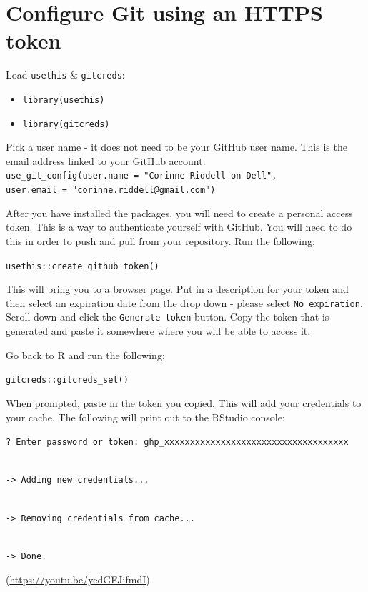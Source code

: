 \documentclass[
]{book}
\providecommand{\tightlist}{%
  \setlength{\itemsep}{0pt}\setlength{\parskip}{0pt}}
\begin{document}
\hypertarget{configure-git-using-an-https-token}{%
\section{Configure Git using an HTTPS token}\label{configure-git-using-an-https-token}}

Load \texttt{usethis} \& \texttt{gitcreds}:

\begin{itemize}
\tightlist
\item
  \texttt{library(usethis)}
\item
  \texttt{library(gitcreds)}
\end{itemize}

Pick a user name - it does not need to be your GitHub user name. This is the email address linked to your GitHub account:\\
\texttt{use\_git\_config(user.name\ =\ "Corinne\ Riddell\ on\ Dell",}
\texttt{user.email\ =\ "corinne.riddell@gmail.com")}

After you have installed the packages, you will need to create a personal access token. This is a way to authenticate yourself with GitHub. You will need to do this in order to push and pull from your repository. Run the following:

\texttt{usethis::create\_github\_token()}

This will bring you to a browser page. Put in a description for your token and then select an expiration date from the drop down - please select \texttt{No\ expiration}. Scroll down and click the \texttt{Generate\ token} button. Copy the token that is generated and paste it somewhere where you will be able to access it.

Go back to R and run the following:

\texttt{gitcreds::gitcreds\_set()}

When prompted, paste in the token you copied. This will add your credentials to your cache. The following will print out to the RStudio console:

\texttt{?\ Enter\ password\ or\ token:\ ghp\_xxxxxxxxxxxxxxxxxxxxxxxxxxxxxxxxxxxx}\strut \\
\texttt{-\textgreater{}\ Adding\ new\ credentials...}\strut \\
\texttt{-\textgreater{}\ Removing\ credentials\ from\ cache...}\strut \\
\texttt{-\textgreater{}\ Done.}

(\url{https://youtu.be/yedGFJifmdI})
\end{document}
